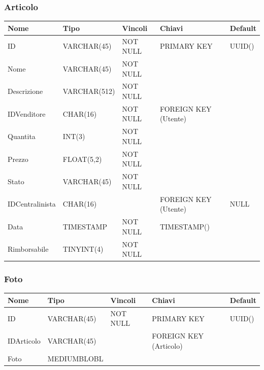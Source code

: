 \documentclass[12pt,a4paper]{article}
\begin{document}
\subsubsection{Articolo}

\begin{center}
\begin{tabular}{|l|l|l|l|l|}
\hline
\rowcolor[HTML]{C0C0C0} 
\textbf{Nome} & \textbf{Tipo} & \textbf{Vincoli} & \textbf{Chiavi} & \textbf{Default}  \\ \hline
ID & VARCHAR(45) & NOT NULL & PRIMARY KEY & UUID() \\ \hline
Nome & VARCHAR(45) & NOT NULL & & \\ \hline
Descrizione & VARCHAR(512) & NOT NULL & & \\ \hline
IDVenditore & CHAR(16) & NOT NULL & FOREIGN KEY (Utente)& \\ \hline
Quantita & INT(3) & NOT NULL & & \\ \hline
Prezzo & FLOAT(5,2) & NOT NULL & & \\ \hline
Stato & VARCHAR(45) & NOT NULL & & \\ \hline
IDCentralinista & CHAR(16) & & FOREIGN KEY (Utente) & NULL \\ \hline
Data & TIMESTAMP & NOT NULL & TIMESTAMP() & \\ \hline
Rimborsabile & TINYINT(4) & NOT NULL & & \\ \hline
\end{tabular}
\end{center}

\subsubsection{Foto}
\begin{center}
\begin{tabular}{|l|l|l|l|l|}
\hline
\rowcolor[HTML]{C0C0C0} 
\textbf{Nome} & \textbf{Tipo} & \textbf{Vincoli} & \textbf{Chiavi} & \textbf{Default}  \\ \hline
ID & VARCHAR(45) & NOT NULL & PRIMARY KEY & UUID() \\ \hline
IDArticolo & VARCHAR(45) & & FOREIGN KEY (Articolo)& \\ \hline
Foto & MEDIUMBLOBL & & & \\ \hline
\end{tabular}
\end{center}
\end{document}

